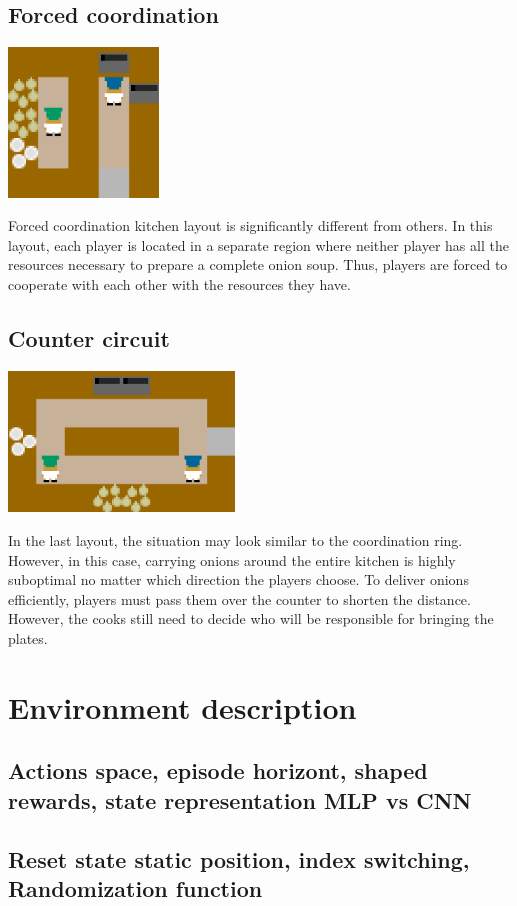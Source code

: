 \subsection*{Forced coordination}
\begin{center}
    \includegraphics*[width=4cm]{../img/forced_coordination_layout.png}
\end{center}
Forced coordination kitchen layout is significantly different from others. 
In this layout, each player is located in a separate region where neither player has all the resources necessary to prepare a complete onion soup. 
Thus, players are forced to cooperate with each other with the resources they have.

\subsection*{Counter circuit}
\begin{center}
    \includegraphics*[width=6cm]{../img/counter_circuit_layout.png}
\end{center}
In the last layout, the situation may look similar to the coordination ring. However, in this case, carrying onions around the entire kitchen is highly suboptimal no matter which direction the players choose. 
To deliver onions efficiently, players must pass them over the counter to shorten the distance. 
However, the cooks still need to decide who will be responsible for bringing the plates. 


\section{Environment description}
\subsection{Actions space, episode horizont, shaped rewards, state representation MLP vs CNN}
\subsection{Reset state static position, index switching, Randomization function}







